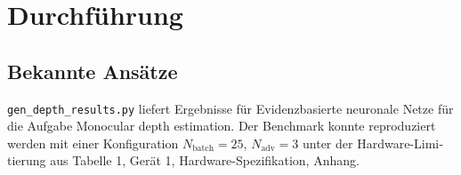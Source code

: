 
\chapter{Durchführung}\label{chapter:durchfuehrung}



\begin{otherlanguage}{american}
  
\end{otherlanguage}



\begin{otherlanguage}{ngerman}
\section*{Bekannte Ansätze}



\parencite{amini2020deep} \texttt{gen\_depth\_results.py} liefert Ergebnisse für \gls{Evidenzbasierte neuronale Netze} für die Aufgabe \glqq Monocular depth estimation\grqq. Der Benchmark konnte reproduziert werden mit einer Konfiguration $N_\text{batch}=25$, $N_\text{adv}=3$ unter der Hardware-Limitierung aus Tabelle 1, Gerät 1, Hardware-Spezifikation, Anhang.





\end{otherlanguage}
